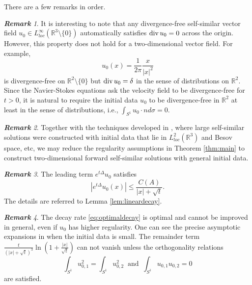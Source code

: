 \documentclass[12pt]{amsart}
\renewcommand{\div}{{\rm div \thinspace }}
\numberwithin{equation}{section}              %
\theoremstyle{remark}
\newtheorem{remark}{\bf Remark}[section]
\begin{document}
	There are a few remarks in order. 
    \begin{remark}\label{rem:deltaatorigin}
It is interesting to note that   any divergence-free  self-similar vector field $u_0\in L^{\infty}_{loc}(\mathbb{R}^3\setminus\{0\})$  automatically satisfies $\div  u_0=0$ across the origin.   However, this property does not hold for a two-dimensional vector field. For example,
\begin{equation*}
    u_0(x) = \frac{1}{2\pi}\frac{x}{|x|^2}
\end{equation*}
is divergence-free on $\mathbb{R}^2\setminus\{0\}$ but $\div u_0=\delta$ in the sense of distributions on $\mathbb{R}^2$.
    Since   the Navier-Stokes equations ask the velocity field to be divergence-free for $t>0$, it is natural to require the initial data $u_0$ to be 
    divergence-free in $\mathbb{R}^2$ at least in the sense of distributions, i.e., $\int_{S^1} u_0\cdot n d\sigma =0$.
  
		
	\end{remark}

    \begin{remark}
        Together with the techniques developed in \cite{Tsai2014, Xue15, Chae18AIHP, Bradshaw19apde, Bradshaw18arma, Albritton19arma}, where large self-similar solutions were constructed  with initial data that  lie in $L^2_{loc}(\mathbb{R}^3)$ and Besov space, etc,
        we may reduce the regularity assumptions in Theorem \ref{thm:main} to construct two-dimensional forward self-similar solutions with general initial data.
    \end{remark}


\begin{remark}
The leading term $e^{t\Delta}u_0$ satisfies 
    \begin{equation*}
        \left|e^{t\Delta}u_0(x)\right| \leq \frac{C(A)}{|x|+\sqrt{t}}.
    \end{equation*}
    The details are referred to Lemma \ref{lem:lineardecay}.
\end{remark}

    \begin{remark}
		The decay rate \eqref{eq:optimaldecay} is optimal and cannot be improved in general, even if $u_0$ has higher regularity. One can see  the precise  asymptotic expansions    in \cite{Brandolese09} when the initial data is small.  The remainder term $\frac{t}{(|x|+\sqrt{t})^3}\ln\left(1+\frac{|x|}{\sqrt{t}}\right)$ can not vanish unless the orthogonality relations 
		\begin{equation*}
			\int_{S^1} u_{0,1}^2=	\int_{S^1} u_{0,2}^2 ~\textrm{ and }~\int_{S^1} u_{0,1} u_{0,2}=0
		\end{equation*}
		are satisfied.
	\end{remark}
\end{document}
